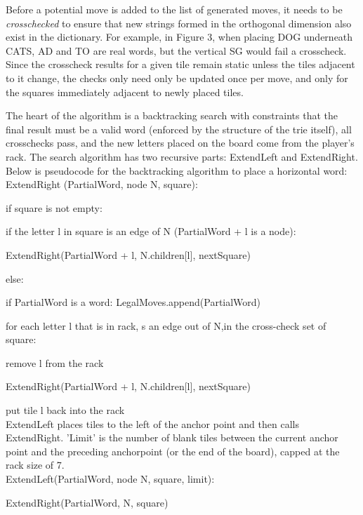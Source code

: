 \documentclass[12pt]{article}
\begin{document}
Before a potential move is added to the list of generated moves, it
needs to be \emph{crosschecked} to ensure that new strings formed in
the orthogonal dimension also exist in the dictionary. For example, in
Figure 3, when placing DOG underneath CATS, AD and TO are real words,
but the vertical SG would fail a crosscheck.  Since the crosscheck
results for a given tile remain static unless the tiles adjacent to it
change, the checks only need only be updated once per move, and only for the
squares immediately adjacent to newly placed tiles.

The heart of the algorithm is a backtracking search with constraints
that the final result must be a valid word (enforced by the structure
of the trie itself), all crosschecks pass, and the new letters placed
on the board come from the player's rack. The search algorithm has two
recursive parts: ExtendLeft and ExtendRight. Below is pseudocode for
the backtracking algorithm to place a horizontal word:\\

\quad ExtendRight (PartialWord, node N, square):

\quad\quad if square is not empty:

\quad\quad\quad if the letter l in square is an edge of N (PartialWord + l is a node):

\quad\quad\quad\quad ExtendRight(PartialWord + l, N.children[l], nextSquare)

\quad\quad else:

\quad\quad\quad if PartialWord is a word: LegalMoves.append(PartialWord)

\quad\quad\quad for each letter l that is in rack, s an edge out of N,in the cross-check set of square:

\quad\quad\quad\quad\quad remove l from the rack

\quad\quad\quad\quad\quad ExtendRight(PartialWord + l, N.children[l], nextSquare)

\quad\quad\quad\quad\quad put tile l back into the rack\\


ExtendLeft places tiles to the left
of the anchor point and then calls ExtendRight. 'Limit' is the number of blank tiles
between the current anchor point and the preceding anchorpoint (or the end of the board), capped at the rack size of 7.\\

\quad ExtendLeft(PartialWord, node N, square, limit):

\quad\quad ExtendRight(PartialWord, N, square)
\end{document}
